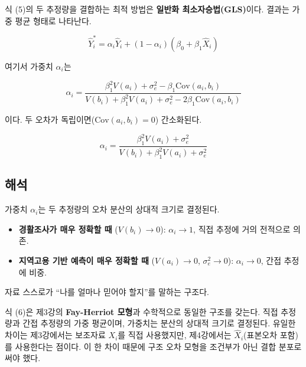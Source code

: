 \documentclass[
  letterpaper,
  DIV=11,
  numbers=noendperiod]{scrreprt}
\providecommand{\tightlist}{%
  \setlength{\itemsep}{0pt}\setlength{\parskip}{0pt}}
\begin{document}
식 (5)의 두 추정량을 결합하는 최적 방법은 \textbf{일반화
최소자승법(GLS)}이다. 결과는 가중 평균 형태로 나타난다.

\[\boxed{\hat{Y}_i^* = \alpha_i \hat{Y}_i + (1 - \alpha_i)(\beta_0 + \beta_1 \hat{X}_i)} \tag{6}\]

여기서 가중치 \(\alpha_i\)는

\[\alpha_i = \frac{\beta_1^2 V(a_i) + \sigma_e^2 - \beta_1 \text{Cov}(a_i, b_i)}{V(b_i) + \beta_1^2 V(a_i) + \sigma_e^2 - 2\beta_1 \text{Cov}(a_i, b_i)}\]

이다. 두 오차가 독립이면(\(\text{Cov}(a_i, b_i) = 0\)) 간소화된다.

\[\alpha_i = \frac{\beta_1^2 V(a_i) + \sigma_e^2}{V(b_i) + \beta_1^2 V(a_i) + \sigma_e^2}\]

\subsection{해석}\label{uxd574uxc11d}

가중치 \(\alpha_i\)는 두 추정량의 오차 분산의 상대적 크기로 결정된다.

\begin{itemize}
\tightlist
\item
  \textbf{경활조사가 매우 정확할 때} (\(V(b_i) \to 0\)):
  \(\alpha_i \to 1\), 직접 추정에 거의 전적으로 의존.
\item
  \textbf{지역고용 기반 예측이 매우 정확할 때} (\(V(a_i) \to 0\),
  \(\sigma_e^2 \to 0\)): \(\alpha_i \to 0\), 간접 추정에 비중.
\end{itemize}

자료 스스로가 ``나를 얼마나 믿어야 할지''를 말하는 구조다.

\begin{tcolorbox}[enhanced jigsaw, arc=.35mm, bottomrule=.15mm, bottomtitle=1mm, breakable, colback=white, colbacktitle=quarto-callout-note-color!10!white, colframe=quarto-callout-note-color-frame, coltitle=black, left=2mm, leftrule=.75mm, opacityback=0, opacitybacktitle=0.6, rightrule=.15mm, title=\textcolor{quarto-callout-note-color}{\faInfo}\hspace{0.5em}{제3강과의 연결}, titlerule=0mm, toprule=.15mm, toptitle=1mm]

식 (6)은 제3강의 \textbf{Fay-Herriot 모형}과 수학적으로 동일한 구조를
갖는다. 직접 추정량과 간접 추정량의 가중 평균이며, 가중치는 분산의
상대적 크기로 결정된다. 유일한 차이는 제3강에서는 보조자료 \(X_i\)를
직접 사용했지만, 제4강에서는 \(\hat{X}_i\)(표본오차 포함)를 사용한다는
점이다. 이 한 차이 때문에 구조 오차 모형을 조건부가 아닌 결합 분포로
써야 했다.

\end{tcolorbox}
\end{document}
